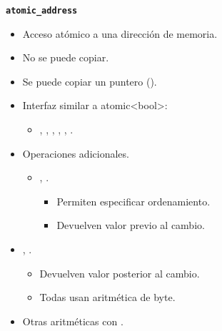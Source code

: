 \begin{frame}[t,fragile]{\texttt{\textbf{atomic\_address}}}
\begin{itemize}
  \item Acceso atómico a una dirección de memoria.
  \item No se puede copiar.
  \item Se puede copiar un puntero ().
  \item Interfaz similar a atomic<bool>:
    \begin{itemize}
      \item {}, , , ,
            , .
    \end{itemize}
  \item Operaciones adicionales.
    \begin{itemize}
      \item {}, .
        \begin{itemize}
          \item Permiten especificar ordenamiento.
          \item Devuelven valor previo al cambio.
        \end{itemize}
    \end{itemize}
      \item \cppid{+=}, \cppid{-=}.
        \begin{itemize}
          \item Devuelven valor posterior al cambio.
          \item Todas usan aritmética de byte.
        \end{itemize}
      \item Otras aritméticas con .
\end{itemize}
\end{frame}


